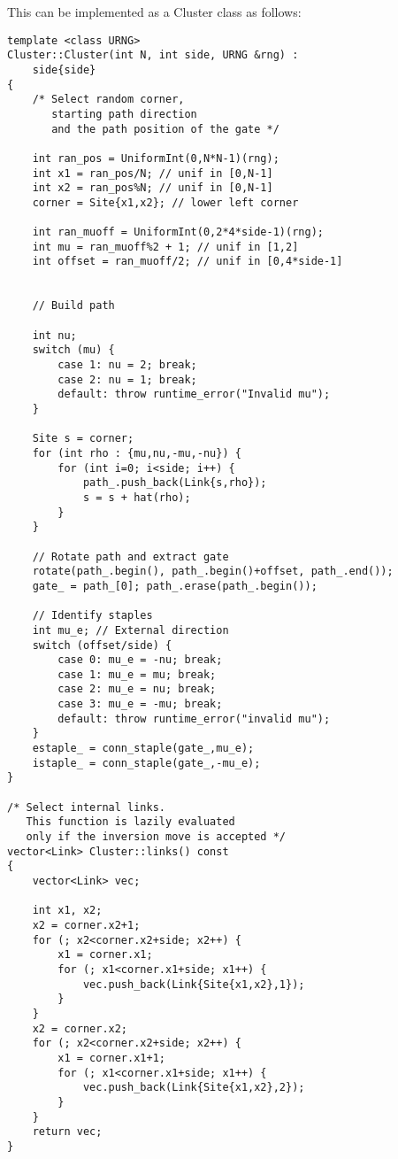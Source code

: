 This can be implemented as a {\ttfamily Cluster} class as follows:

\begin{lstlisting}[caption={Cluster class implementation}]
template <class URNG>
Cluster::Cluster(int N, int side, URNG &rng) :
    side{side}
{
    /* Select random corner,
       starting path direction
       and the path position of the gate */

    int ran_pos = UniformInt(0,N*N-1)(rng);
    int x1 = ran_pos/N; // unif in [0,N-1]
    int x2 = ran_pos%N; // unif in [0,N-1]
    corner = Site{x1,x2}; // lower left corner

    int ran_muoff = UniformInt(0,2*4*side-1)(rng);
    int mu = ran_muoff%2 + 1; // unif in [1,2]
    int offset = ran_muoff/2; // unif in [0,4*side-1]


    // Build path

    int nu;
    switch (mu) {
        case 1: nu = 2; break;
        case 2: nu = 1; break;
        default: throw runtime_error("Invalid mu");
    }

    Site s = corner;
    for (int rho : {mu,nu,-mu,-nu}) {
        for (int i=0; i<side; i++) {
            path_.push_back(Link{s,rho});
            s = s + hat(rho);
        }
    }

    // Rotate path and extract gate
    rotate(path_.begin(), path_.begin()+offset, path_.end());
    gate_ = path_[0]; path_.erase(path_.begin());
    
    // Identify staples
    int mu_e; // External direction
    switch (offset/side) {
        case 0: mu_e = -nu; break;
        case 1: mu_e = mu; break;
        case 2: mu_e = nu; break;
        case 3: mu_e = -mu; break;
        default: throw runtime_error("invalid mu");
    }
    estaple_ = conn_staple(gate_,mu_e);
    istaple_ = conn_staple(gate_,-mu_e);
}

/* Select internal links.
   This function is lazily evaluated
   only if the inversion move is accepted */
vector<Link> Cluster::links() const
{
    vector<Link> vec;

    int x1, x2;
    x2 = corner.x2+1;
    for (; x2<corner.x2+side; x2++) {
        x1 = corner.x1;
        for (; x1<corner.x1+side; x1++) {
            vec.push_back(Link{Site{x1,x2},1});
        }
    }
    x2 = corner.x2;
    for (; x2<corner.x2+side; x2++) {
        x1 = corner.x1+1;
        for (; x1<corner.x1+side; x1++) {
            vec.push_back(Link{Site{x1,x2},2});
        }
    }
    return vec;
}
\end{lstlisting}


